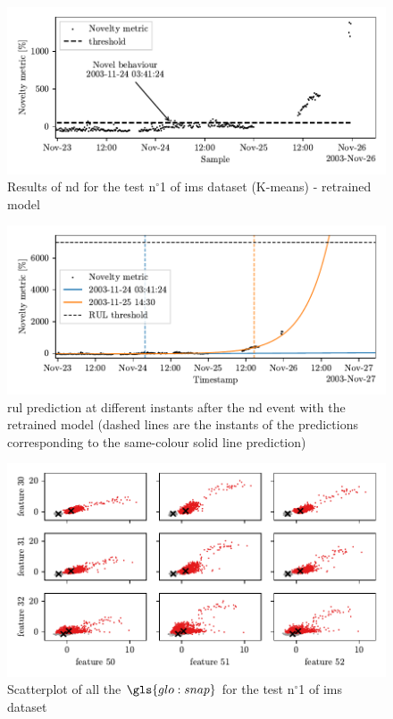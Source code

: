 \begin{figure}
    \centering
    \includegraphics{images/IMS/Novelty_01_500samples_bearing3x_retrained.pdf}
    \caption{Results of \gls{nd} for the test $\text{n}^\circ$1 of \gls{ims} dataset (K-means) - retrained model}
    \label{fig:NoveltyScore_01_retrained}
\end{figure}

\begin{figure}
    \centering
    \includegraphics{images/IMS/Novelty_01_500samples_bearing3x_predictions_retrained.pdf}
    \caption{\gls{rul} prediction at different instants after the \gls{nd} event with the retrained model (dashed lines are the instants of the predictions corresponding to the same-colour solid line prediction)}
    \label{fig:RULPredictions01_retrained}
\end{figure}

\begin{figure}
    \centering
    \includegraphics{images/IMS/Clusters_novelty.pdf}
    \caption{Scatterplot of all the $\gls{glo:snap}$ for the test $\text{n}^\circ$1 of \gls{ims} dataset}
    \label{fig:Clusters_novelty}
\end{figure}

